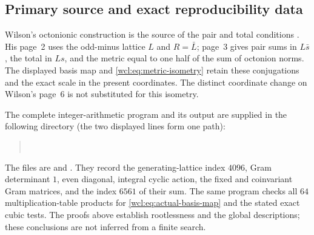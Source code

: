 \subsection{Primary source and exact reproducibility data}

Wilson's octonionic construction is the source of the pair and total
conditions \cite[Sections~2--4, pp.~2--6]{esn:Wilson2009}. His page~2
uses the odd-minus lattice $L$ and $R=\bar L$; page~3 gives pair sums
in $L\bar s$, the total in $Ls$, and the metric equal to one half of
the sum of octonion norms. The displayed basis map and
\eqref{wcl:eq:metric-isometry} retain these conjugations and the exact
scale in the present coordinates. The distinct coordinate change on
Wilson's page~6 is not substituted for this isometry.

The complete integer-arithmetic program and its output are supplied in the
following directory (the two displayed lines form one path):
\begin{quote}\small
{}\\
\end{quote}
The files are  and .
They record the generating-lattice index $4096$, Gram determinant $1$,
even diagonal, integral cyclic action, the fixed and coinvariant Gram
matrices, and the index $6561$ of their sum. The same program checks
all $64$ multiplication-table products for
\eqref{wcl:eq:actual-basis-map} and the stated exact cubic tests.
The proofs above establish rootlessness and the global descriptions;
these conclusions are not inferred from a finite search.

